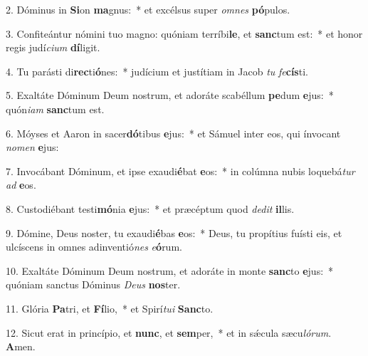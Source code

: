 2. Dóminus in \textbf{Si}on \textbf{ma}gnus:~*  et excélsus super \textit{om}\textit{nes} \textbf{pó}pulos.\

3. Confiteántur nómini tuo magno: quóniam terríbi\textbf{le}, et \textbf{sanc}tum est:~*  et honor regis judí\textit{ci}\textit{um} \textbf{dí}ligit.\

4. Tu parásti di\textbf{rec}ti\textbf{ó}nes:~*  judícium et justítiam in Jacob \textit{tu} \textit{fe}\textbf{cís}ti.\

5. Exaltáte Dóminum Deum nostrum, et adoráte scabéllum \textbf{pe}dum \textbf{e}jus:~*  quón\textit{i}\textit{am} \textbf{sanc}tum est.\

6. Móyses et Aaron in sacer\textbf{dó}tibus \textbf{e}jus:~*  et Sámuel inter eos, qui ínvocant \textit{no}\textit{men} \textbf{e}jus:\

7. Invocábant Dóminum, et ipse exaudi\textbf{é}bat \textbf{e}os:~*  in colúmna nubis loquebá\textit{tur} \textit{ad} \textbf{e}os.\

8. Custodiébant testi\textbf{mó}nia \textbf{e}jus:~*  et præcéptum quod \textit{de}\textit{dit} \textbf{il}lis.\

9. Dómine, Deus noster, tu exaudi\textbf{é}bas \textbf{e}os:~*  Deus, tu propítius fuísti eis, et ulcíscens in omnes adinventió\textit{nes} \textit{e}\textbf{ó}rum.\

10. Exaltáte Dóminum Deum nostrum, et adoráte in monte \textbf{sanc}to \textbf{e}jus:~*  quóniam sanctus Dóminus \textit{De}\textit{us} \textbf{nos}ter.\

11. Glória \textbf{Pa}tri, et \textbf{Fí}lio,~*  et Spirí\textit{tu}\textit{i} \textbf{Sanc}to.\

12. Sicut erat in princípio, et \textbf{nunc}, et \textbf{sem}per,~*  et in sǽcula sæcu\textit{ló}\textit{rum}. \textbf{A}men.\

